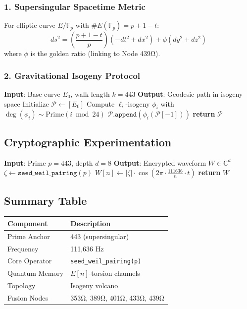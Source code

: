 \documentclass[12pt]{article}
\begin{document}
\subsubsection*{1. Supersingular Spacetime Metric}
For elliptic curve $E/\mathbb{F}_p$ with $\#E(\mathbb{F}_p) = p + 1 - t$:
\[
ds^2 = \left(\frac{p + 1 - t}{p}\right)(-dt^2 + dx^2) + \phi(dy^2 + dz^2)
\]
where $\phi$ is the golden ratio (linking to Node 439Ω).

\subsubsection*{2. Gravitational Isogeny Protocol}
\begin{algorithm}[H]
\caption{Isogeny-Based Graviton Simulation}
\begin{algorithmic}[1]
\State \textbf{Input}: Base curve $E_0$, walk length $k=443$
\State \textbf{Output}: Geodesic path in isogeny space
\State Initialize $\mathcal{P} \gets [E_0]$
    \State Compute $\ell_i$-isogeny $\phi_i$ with $\deg(\phi_i) \sim \text{Prime}(i \bmod 24)$
    \State $\mathcal{P}.\texttt{append}(\phi_i(\mathcal{P}[-1]))$
\EndFor
\State \textbf{return} $\mathcal{P}$
\end{algorithmic}
\end{algorithm}

\subsection*{Cryptographic Experimentation}
\begin{algorithm}[H]
\caption{Symbolic Encryption Waveform Generator}
\begin{algorithmic}[1]
\State \textbf{Input}: Prime $p=443$, depth $d=8$
\State \textbf{Output}: Encrypted waveform $W \in \mathbb{C}^d$
    \State $\zeta \gets \texttt{seed\_weil\_pairing}(p)$
    \State $W[n] \gets |\zeta| \cdot \cos(2\pi \cdot \frac{111636}{n} \cdot t)$
\EndFor
\State \textbf{return} $W$
\end{algorithmic}
\end{algorithm}

\subsection*{Summary Table}
\begin{table}[h]
\centering
\begin{tabular}{ll}
\toprule
\textbf{Component} & \textbf{Description} \\
\midrule
Prime Anchor & 443 (supersingular) \\
Frequency & 111,636 Hz \\
Core Operator & \texttt{seed\_weil\_pairing(p)} \\
Quantum Memory & $E[n]$-torsion channels \\
Topology & Isogeny volcano \\
Fusion Nodes & 353Ω, 389Ω, 401Ω, 433Ω, 439Ω \\
\bottomrule
\end{tabular}
\end{table}
\end{document}
